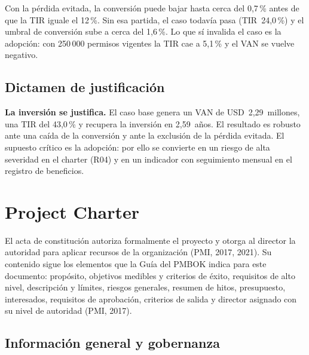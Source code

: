 \documentclass[11pt,a4paper]{article}
\newcommand{\usd}[1]{USD~#1}
\newcommand{\clave}[1]{%
  \par\smallskip\noindent\colorbox{suave}{\parbox{\dimexpr\textwidth-2\fboxsep\relax}{\setstretch{1.15}\small #1}}\par\smallskip}
\begin{document}
Con la pérdida evitada, la conversión puede bajar hasta cerca del 0,7\,\% antes de que la TIR iguale el 12\,\%. Sin esa partida, el caso todavía pasa (TIR~24,0\,\%) y el umbral de conversión sube a cerca del 1,6\,\%. Lo que sí invalida el caso es la adopción: con 250\,000 permisos vigentes la TIR cae a 5,1\,\% y el VAN se vuelve negativo.

\subsection{Dictamen de justificación}

\clave{\textbf{La inversión se justifica.} El caso base genera un VAN de \usd{2,29}~millones, una TIR del 43,0\,\% y recupera la inversión en 2,59~años. El resultado es robusto ante una caída de la conversión y ante la exclusión de la pérdida evitada. El supuesto crítico es la adopción: por ello se convierte en un riesgo de alta severidad en el charter (R04) y en un indicador con seguimiento mensual en el registro de beneficios.}

\clearpage
\section{Project Charter}\label{sec:charter}

El acta de constitución autoriza formalmente el proyecto y otorga al director la autoridad para aplicar recursos de la organización (PMI, 2017, 2021). Su contenido sigue los elementos que la Guía del PMBOK indica para este documento: propósito, objetivos medibles y criterios de éxito, requisitos de alto nivel, descripción y límites, riesgos generales, resumen de hitos, presupuesto, interesados, requisitos de aprobación, criterios de salida y director asignado con su nivel de autoridad (PMI, 2017).

\subsection{Información general y gobernanza}\label{sec:gobernanza}
\end{document}
